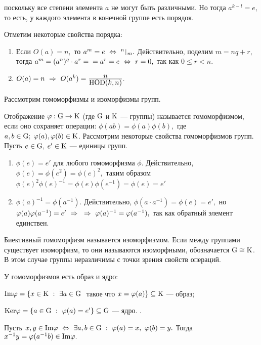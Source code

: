 поскольку все степени элемента $a$ не могут быть различными. Но тогда $a^{k-l}=e$, то есть, у каждого элемента в конечной группе есть порядок.
\par Отметим некоторые свойства порядка:
\begin{enumerate}
    \item Если $O(a)=n,$ то $a^m=e\lra {}^n\,\vrule\,{}_m.$ Действительно, поделим $m=nq+r,$ тогда $a^m=(a^n)^q\cdot a^r=\\=a^r=e\ \Leftrightarrow\  r=0,$ так как $0\le r<n$.
    \item $O(a)=n\ \Rightarrow\  O(a^k)=\frac{\displaystyle n}{\displaystyle {\rm HOD}(k,n)}.$
\end{enumerate}
\par Рассмотрим гомоморфизмы и изоморфизмы групп.
\par\de Отображение $\varphi : {\rm G}\rightarrow {\rm K}$ (где ${\rm G}$ и ${\rm K}$ --- группы) называется гомоморфизмом, если оно сохраняет
операции: $\phi(ab)=\phi(a)\phi(b),$ где $a,b\in{\rm G};\;\varphi(a),\varphi(b)\in{\rm K}$. Рассмотрим некоторые свойства гомоморфизмов групп.
Пусть $e\in{\rm G},\; e'\in{\rm K}$ --- единицы групп.
\begin{enumerate}
    \item $\phi(e)=e'$ для любого гомоморфизма $\phi$. Действительно, $\phi(e)=\phi(e^2)=\phi(e)^2,$ таким образом $\phi(e)^2\phi(e)^{-1}=\phi(e)\phi(e^{-1})=\phi(e)=e'$
    \item $\phi(a)^{-1}=\phi(a^{-1}).$ Действительно, $\phi(a\cdot a^{-1})=\phi(e)=e',$ но $\varphi(a)\varphi(a^{-1})=e'\ \Rightarrow\ \\\ \Rightarrow\ \varphi(a)^{-1}=\varphi(a^{-1}),$ так как
    обратный элемент единствен.
\end{enumerate}
\par\de Биективный гомоморфизм называется изоморфизмом. Если между группами существует изоморфизм, то они называются изоморфными, обозначается ${\rm G}\cong{\rm K}$.
В этом случае группы неразличимы с точки зрения свойств операций.
\par У гомоморфизмов есть образ и ядро:
\par\de ${\rm Im}\varphi=\{x\in{\rm K}\ :\ \exists a\in {\rm G}\ $ такое что $x=\varphi(a)\}\subseteq {\rm K}$ --- образ;
\par\de $\rr{Ker}\phi=\{a\in\rr{G}\ :\ \phi(a)=e'\}\subseteq\rr{G}$ --- ядро.
.
\par\dok Пусть $x,y\in{\rm Im}\varphi\ \Leftrightarrow\ \exists a,b\in{\rm G}\ :\ \varphi(a)=x,\ \varphi(b)=y.$ Тогда $x^{-1}y=\varphi(a^{-1}b)\in{\rm Im}\varphi.$\\
